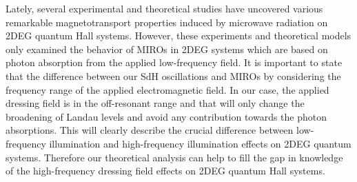 \documentclass[
 reprint,
 amsmath,amssymb,
 aps,
 prb,
]{revtex4-2}
\begin{document}
{\color{Red}
Lately, several experimental \cite{zudov01,mani02,zudov03,mani04} and theoretical \cite{durst03,dmitriev03,dmitriev05,dmitriev09} studies have uncovered various remarkable magnetotransport properties induced by microwave radiation on 2DEG quantum Hall systems. However, these experiments and theoretical models only examined the behavior of MIROs in 2DEG systems which are based on photon absorption from the applied low-frequency field.
It is important to state that the difference between our SdH oscillations and MIROs \cite{zudov01,mani02,zudov03,mani04} by considering the frequency range of the applied electromagnetic field. In our case, the applied dressing field is in the off-resonant range and that will only change the broadening of Landau levels and avoid any contribution towards the photon absorptions. This will clearly describe the crucial difference between low-frequency illumination and high-frequency illumination effects on 2DEG quantum systems. Therefore our theoretical analysis can help to fill the gap in knowledge of the high-frequency dressing field effects on 2DEG quantum Hall systems.
}
\end{document}
